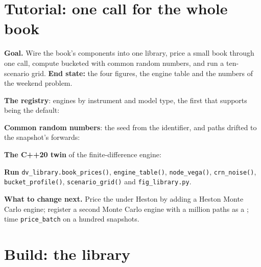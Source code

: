\section{Tutorial: one call for the whole book}\label{tut:dv:build-a-pricing-library:tut}

\begin{tutorial}
\textbf{Goal.} Wire the book's components into one library, price a small book through one call, compute bucketed  with common random numbers, and run a
ten-scenario grid. \textbf{End state:} the four figures, the engine table and the numbers of the weekend problem.
\begin{tutsteps}
\item \textbf{The registry}: engines by instrument and model type, the first that supports being the default:
\label{lst:dv:build-a-pricing-library:registry}
\item \textbf{Common random numbers}: the seed from the identifier, and paths drifted to the snapshot's forwards:
\label{lst:dv:build-a-pricing-library:mc}
\item \textbf{The C++20 twin} of the finite-difference engine:
\label{lst:dv:build-a-pricing-library:cpp}
\item \textbf{Run} \texttt{dv\_library.book\_prices()}, \texttt{engine\_table()}, \texttt{node\_vega()}, \texttt{crn\_noise()}, \texttt{bucket\_profile()},
\texttt{scenario\_grid()} and \texttt{fig\_library.py}.
\end{tutsteps}
\textbf{What to change next.} Price the  under Heston by adding a Heston Monte Carlo engine; register a second Monte Carlo engine with a million paths as
a ; time \texttt{price\_batch} on a hundred snapshots.
\end{tutorial}

\section{Build: the library}\label{bld:dv:build-a-pricing-library:pricing}

